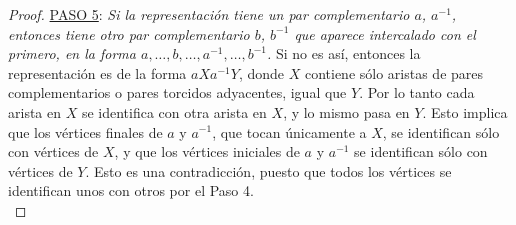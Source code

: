 \documentclass[10pt]{report}
\theoremstyle{definition}
\begin{document}
\begin{proof}
%

\underline{PASO 5}: \textit{Si la representación tiene un par complementario $a$, $a^{-1}$, entonces tiene otro par complementario $b$,  $b^{-1}$ que aparece intercalado con el primero, en la forma $a,\dots , b, \dots ,a^{-1}, \dots , b^{-1} $.} Si no es así, entonces la representación es de la forma $aXa^{-1}Y$, donde $X$ contiene sólo aristas de pares complementarios o pares torcidos adyacentes, igual que $Y$. Por lo tanto cada arista en $X$ se identifica con otra arista en $X$, y lo mismo pasa en $Y$. Esto implica que los vértices finales de $a$ y $a^{-1}$, que tocan únicamente a $X$, se identifican sólo con vértices de $X$, y que los vértices iniciales de $a$ y $a^{-1}$ se identifican sólo con vértices de $Y$. Esto es una contradicción, puesto que todos los vértices se identifican unos con otros por el Paso 4.\\


\end{proof}
\end{document}

